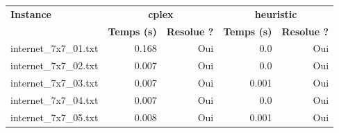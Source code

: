 \documentclass{article}
\begin{document}
\begin{center}
\renewcommand{\arraystretch}{1.3}
\begin{tabular}{lrrrr}
\hline
\textbf{Instance} & \multicolumn{2}{c}{\textbf{cplex}} & \multicolumn{2}{c}{\textbf{heuristic}}\\
 & \textbf{Temps (s)} & \textbf{Resolue ?} & \textbf{Temps (s)} & \textbf{Resolue ?}\\ \hline
internet\_7x7\_01.txt & 0.168 & Oui & 0.0 & Oui\\
internet\_7x7\_02.txt & 0.007 & Oui & 0.0 & Oui\\
internet\_7x7\_03.txt & 0.007 & Oui & 0.001 & Oui\\
internet\_7x7\_04.txt & 0.007 & Oui & 0.0 & Oui\\
internet\_7x7\_05.txt & 0.008 & Oui & 0.001 & Oui\\
\hline
\end{tabular}
\end{center}
\end{document}
